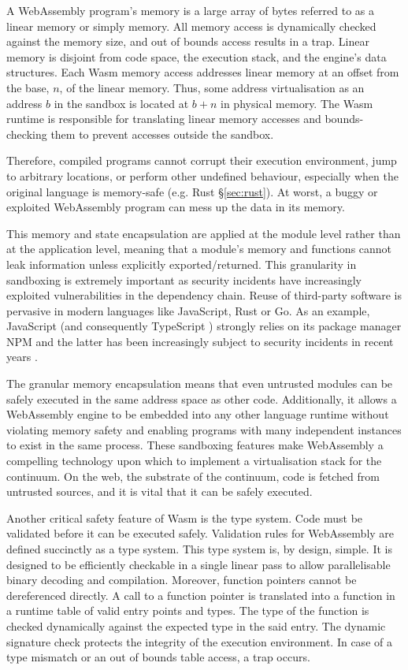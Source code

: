 A WebAssembly program's memory is a large array of bytes referred to as a linear memory or simply memory. All memory access is dynamically checked against the memory size, and out of bounds access results in a trap. Linear memory is disjoint from code space, the execution stack, and the engine's data structures. Each Wasm memory access addresses linear memory at an offset from the base, $n$, of the linear memory. Thus, some address virtualisation as an address $b$ in the sandbox is located at $b + n$ in physical memory. The Wasm runtime is responsible for translating linear memory accesses and bounds-checking them to prevent accesses outside the sandbox.

Therefore, compiled programs cannot corrupt their execution environment, jump to arbitrary locations, or perform other undefined behaviour, especially when the original language is memory-safe (e.g. Rust §\ref{sec:rust}). At worst, a buggy or exploited WebAssembly program can mess up the data in its memory.

This memory and state encapsulation are applied at the module level rather than at the application level, meaning that a module's memory and functions cannot leak information unless explicitly exported/returned. This granularity in sandboxing is extremely important as security incidents have increasingly exploited vulnerabilities in the dependency chain. Reuse of third-party software is pervasive in modern languages like JavaScript, Rust or Go. As an example, JavaScript (and consequently TypeScript \cite{typescript}) strongly relies on its package manager NPM and the latter has been increasingly subject to security incidents in recent years \cite{npm-security}.

The granular memory encapsulation means that even untrusted modules can be safely executed in the same address space as other code. Additionally, it allows a WebAssembly engine to be embedded into any other language runtime without violating memory safety and enabling programs with many independent instances to exist in the same process. These sandboxing features make WebAssembly a compelling technology upon which to implement a virtualisation stack for the continuum. On the web, the substrate of the continuum, code is fetched from untrusted sources, and it is vital that it can be safely executed.

Another critical safety feature of Wasm is the type system. Code must be validated before it can be executed safely. Validation rules for WebAssembly are defined succinctly as a type system. This type system is, by design, simple. It is designed to be efficiently checkable in a single linear pass to allow parallelisable binary decoding and compilation.
Moreover, function pointers cannot be dereferenced directly. A call to a function pointer is translated into a function in a runtime table of valid entry points and types. The type of the function is checked dynamically against the expected type in the said entry. The dynamic signature check protects the integrity of the execution environment. In case of a type mismatch or an out of bounds table access, a trap occurs.

